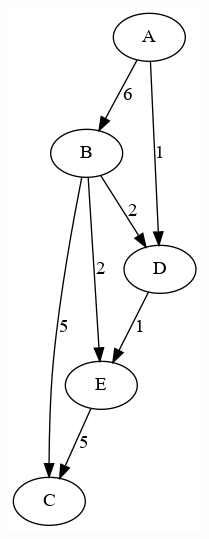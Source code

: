 \documentclass[11pt]{article}
\begin{document}
\begin{center}
\includegraphics[width=.9\linewidth]{dijkstra.png}
\end{center}
\end{document}
